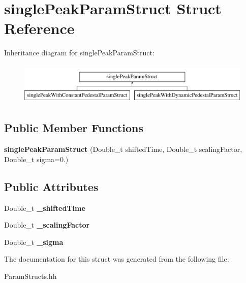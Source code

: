 \hypertarget{structsingle_peak_param_struct}{}\section{single\+Peak\+Param\+Struct Struct Reference}
\label{structsingle_peak_param_struct}
Inheritance diagram for single\+Peak\+Param\+Struct\+:\begin{figure}[H]
\begin{center}
\leavevmode
\includegraphics[height=2.000000cm]{structsingle_peak_param_struct}
\end{center}
\end{figure}
\subsection*{Public Member Functions}
\begin{DoxyCompactItemize}
\item 
\hypertarget{structsingle_peak_param_struct_acdd82f9fe9a24d725c672509f7cff025}{}{\bfseries single\+Peak\+Param\+Struct} (Double\+\_\+t shifted\+Time, Double\+\_\+t scaling\+Factor, Double\+\_\+t sigma=0.)\label{structsingle_peak_param_struct_acdd82f9fe9a24d725c672509f7cff025}

\end{DoxyCompactItemize}
\subsection*{Public Attributes}
\begin{DoxyCompactItemize}
\item 
\hypertarget{structsingle_peak_param_struct_aae2389f2da24586e2fd21ce38b33edd1}{}Double\+\_\+t {\bfseries \+\_\+shifted\+Time}\label{structsingle_peak_param_struct_aae2389f2da24586e2fd21ce38b33edd1}

\item 
\hypertarget{structsingle_peak_param_struct_a72d0a676851e57dd6c336df4ae4cf61d}{}Double\+\_\+t {\bfseries \+\_\+scaling\+Factor}\label{structsingle_peak_param_struct_a72d0a676851e57dd6c336df4ae4cf61d}

\item 
\hypertarget{structsingle_peak_param_struct_a323e63c0fe70f09f342080c7a6736ad8}{}Double\+\_\+t {\bfseries \+\_\+sigma}\label{structsingle_peak_param_struct_a323e63c0fe70f09f342080c7a6736ad8}

\end{DoxyCompactItemize}


The documentation for this struct was generated from the following file\+:\begin{DoxyCompactItemize}
\item 
Param\+Structs.\+hh\end{DoxyCompactItemize}
